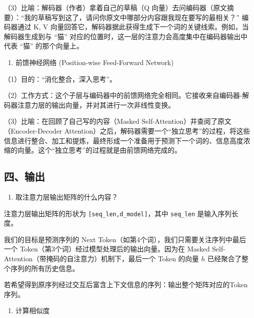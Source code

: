 （3）比喻：解码器（作者）拿着自己的草稿（Q 向量）去问编码器（原文摘要）：``我的草稿写到这了，请问你原文中哪部分内容跟我现在要写的最相关？'' 编码器通过 K, V 向量回答它，解码器据此获得生成下一个词的关键线索。例如，当解码器生成到与 ``猫'' 对应的位置时，这一层的注意力会高度集中在编码器输出中代表 ``猫'' 的那个向量上。

\begin{enumerate}
\def\labelenumi{\arabic{enumi}.}
\setcounter{enumi}{2}
\tightlist
\item
  前馈神经网络 (Position-wise Feed-Forward Network)
\end{enumerate}

（1）目的：``消化整合，深入思考''。

（2）工作方式：这个子层与编码器中的前馈网络完全相同。它接收来自编码器-解码器注意力层的输出向量，并对其进行一次非线性变换。

（3）比喻：在回顾了自己写的内容（Masked Self-Attention）并查阅了原文（Encoder-Decoder Attention）之后，解码器需要一个``独立思考''的过程，将这些信息进行整合、加工和提炼，最终形成一个准备用于预测下一个词的、信息高度浓缩的向量。这个``独立思考''的过程就是由前馈网络完成的。

\hypertarget{ux56dbux8f93ux51fa}{%
\subsection{四、输出}\label{ux56dbux8f93ux51fa}}

\begin{enumerate}
\def\labelenumi{\arabic{enumi}.}
\tightlist
\item
  取注意力层输出矩阵的什么内容？
\end{enumerate}

注意力层输出矩阵的形状为 \texttt{{[}seq\_len,d\_model{]}}，其中 \texttt{seq\_len} 是输入序列长度。

我们的目标是预测序列的 Next Token（如第4个词），我们只需要关注序列中最后一个 Token（第3个词）经过模型处理后的输出向量。因为在 Masked Self-Attention（带掩码的自注意力）机制下，最后一个 Token 的向量 \(h\) 已经聚合了整个序列的所有历史信息。

若希望得到原序列经过交互后富含上下文信息的序列：输出整个矩阵对应的Token序列。

\begin{enumerate}
\def\labelenumi{\arabic{enumi}.}
\setcounter{enumi}{1}
\tightlist
\item
  计算相似度
\end{enumerate}

